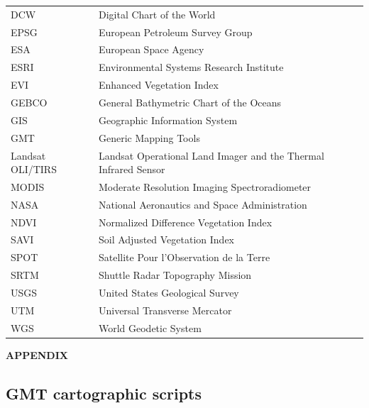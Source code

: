 \documentclass[12pt,a4paper,oneside]{article}
\def \newsection{\vspace{12pt}\textbf}
\begin{document}
\begin{tabular}{@{}ll}
DCW & Digital Chart of the World \\
EPSG & European Petroleum Survey Group \\
ESA & European Space Agency \\
ESRI & Environmental Systems Research Institute \\
EVI & Enhanced Vegetation Index \\
GEBCO & General Bathymetric Chart of the Oceans \\
GIS & Geographic Information System \\
GMT & Generic Mapping Tools \\
Landsat OLI/TIRS & Landsat Operational Land Imager and the Thermal Infrared Sensor \\
MODIS & Moderate Resolution Imaging Spectroradiometer \\
NASA & National Aeronautics and Space Administration \\
NDVI & Normalized Difference Vegetation Index \\
SAVI & Soil Adjusted Vegetation Index \\
SPOT & Satellite Pour l'Observation de la Terre \\
SRTM & Shuttle Radar Topography Mission \\
USGS & United States Geological Survey \\
UTM & Universal Transverse Mercator \\
WGS & World Geodetic System \\
\end{tabular}

\vspace{12pt}

\newsection {APPENDIX}
\vspace{12pt}

\subsection*{GMT cartographic scripts}
\end{document}
